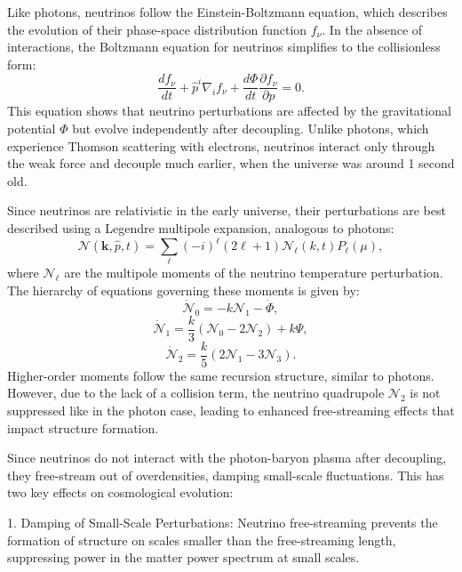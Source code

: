 \documentclass{aa}
\begin{document}
Like photons, neutrinos follow the Einstein-Boltzmann equation, which describes the evolution of their phase-space distribution function $f_\nu$. In the absence of interactions, the Boltzmann equation for neutrinos simplifies to the collisionless form:
\begin{equation}
\frac{df_\nu}{dt} + \hat{p}^i \nabla_i f_\nu + \frac{d\Phi}{dt} \frac{\partial f_\nu}{\partial p} = 0.
\end{equation}
This equation shows that neutrino perturbations are affected by the gravitational potential $\Phi$ but evolve independently after decoupling. Unlike photons, which experience Thomson scattering with electrons, neutrinos interact only through the weak force and decouple much earlier, when the universe was around 1 second old.

Since neutrinos are relativistic in the early universe, their perturbations are best described using a Legendre multipole expansion, analogous to photons:
\begin{equation}
\mathcal{N}(\mathbf{k}, \hat{p}, t) = \sum_{\ell} (-i)^\ell (2\ell + 1) \mathcal{N}_\ell (k, t) P_\ell(\mu),
\end{equation}
where $\mathcal{N}_\ell$ are the multipole moments of the neutrino temperature perturbation. The hierarchy of equations governing these moments is given by:
\begin{equation}
\dot{\mathcal{N}}_0 = -k \mathcal{N}_1 - \dot{\Phi},
\end{equation}\begin{equation}
\dot{\mathcal{N}}_1 = \frac{k}{3} \left(\mathcal{N}_0 - 2 \mathcal{N}_2 \right) + k \Psi,
\end{equation}\begin{equation}
\dot{\mathcal{N}}_2 = \frac{k}{5} \left(2 \mathcal{N}_1 - 3 \mathcal{N}_3 \right).
\end{equation}
Higher-order moments follow the same recursion structure, similar to photons. However, due to the lack of a collision term, the neutrino quadrupole $\mathcal{N}_2$ is not suppressed like in the photon case, leading to enhanced free-streaming effects that impact structure formation. 

Since neutrinos do not interact with the photon-baryon plasma after decoupling, they free-stream out of overdensities, damping small-scale fluctuations. This has two key effects on cosmological evolution:

1. Damping of Small-Scale Perturbations:  
   Neutrino free-streaming prevents the formation of structure on scales smaller than the free-streaming length, suppressing power in the matter power spectrum at small scales.
\end{document}
